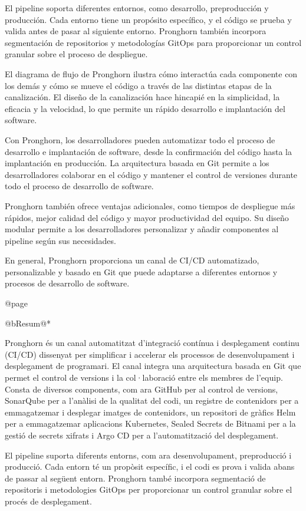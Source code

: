 El pipeline soporta diferentes entornos, como desarrollo, preproducción y producción. Cada entorno tiene un propósito específico, y el código se prueba y valida antes de pasar al siguiente entorno. Pronghorn también incorpora segmentación de repositorios y metodologías GitOps para proporcionar un control granular sobre el proceso de despliegue.

El diagrama de flujo de Pronghorn ilustra cómo interactúa cada componente con los demás y cómo se mueve el código a través de las distintas etapas de la canalización. El diseño de la canalización hace hincapié en la simplicidad, la eficacia y la velocidad, lo que permite un rápido desarrollo e implantación del software.

Con Pronghorn, los desarrolladores pueden automatizar todo el proceso de desarrollo e implantación de software, desde la confirmación del código hasta la implantación en producción. La arquitectura basada en Git permite a los desarrolladores colaborar en el código y mantener el control de versiones durante todo el proceso de desarrollo de software.

Pronghorn también ofrece ventajas adicionales, como tiempos de despliegue más rápidos, mejor calidad del código y mayor productividad del equipo. Su diseño modular permite a los desarrolladores personalizar y añadir componentes al pipeline según sus necesidades.

En general, Pronghorn proporciona un canal de CI/CD automatizado, personalizable y basado en Git que puede adaptarse a diferentes entornos y procesos de desarrollo de software.

@page

@b{Resum}@*


Pronghorn és un canal automatitzat d'integració contínua i desplegament continu (CI/CD) dissenyat per simplificar i accelerar els processos de desenvolupament i desplegament de programari. El canal integra una arquitectura basada en Git que permet el control de versions i la col·laboració entre els membres de l'equip. Consta de diversos components, com ara GitHub per al control de versions, SonarQube per a l'anàlisi de la qualitat del codi, un registre de contenidors per a emmagatzemar i desplegar imatges de contenidors, un repositori de gràfics Helm per a emmagatzemar aplicacions Kubernetes, Sealed Secrets de Bitnami per a la gestió de secrets xifrats i Argo CD per a l'automatització del desplegament.

El pipeline suporta diferents entorns, com ara desenvolupament, preproducció i producció. Cada entorn té un propòsit específic, i el codi es prova i valida abans de passar al següent entorn. Pronghorn també incorpora segmentació de repositoris i metodologies GitOps per proporcionar un control granular sobre el procés de desplegament.

